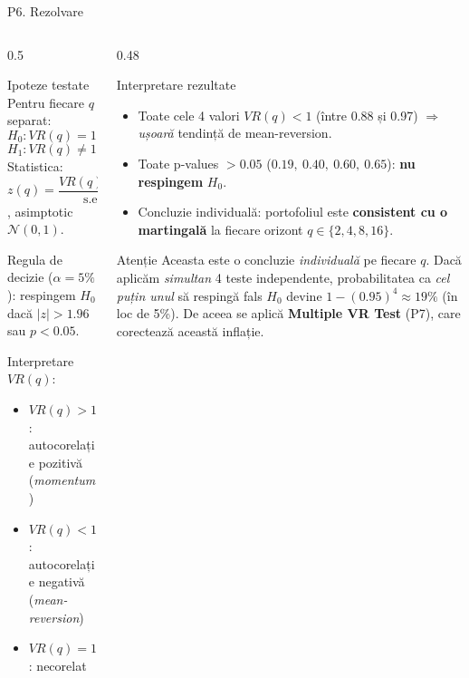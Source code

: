 \documentclass[9pt, aspectratio=169, t]{beamer}
\begin{document}
\begin{frame}[shrink=30]{P6. Rezolvare}
\begin{columns}[T]
\begin{column}{0.5\textwidth}
\begin{block}{Ipoteze testate}
Pentru fiecare $q$ separat:
\[
H_0: VR(q) = 1 \quad\Leftrightarrow\quad r_t \text{ martingal ( $P_t$ random walk)}
\]
\[
H_1: VR(q) \neq 1 \quad\Leftrightarrow\quad \text{autocorelație nenulă}
\]
Statistica: $z(q) = \dfrac{VR(q) - 1}{\text{s.e.}}$, asimptotic $\mathcal N(0,1)$.

Regula de decizie ($\alpha=5\%$): respingem $H_0$ dacă $|z|>1.96$ sau $p<0.05$.

Interpretare $VR(q)$:
\begin{itemize}\setlength{\itemsep}{0pt}
    \item $VR(q)>1$: autocorelație pozitivă (\emph{momentum})
    \item $VR(q)<1$: autocorelație negativă (\emph{mean-reversion})
    \item $VR(q)=1$: necorelat
\end{itemize}
\end{block}
\end{column}
\begin{column}{0.48\textwidth}
\begin{block}{Interpretare rezultate}
\begin{itemize}\setlength{\itemsep}{1pt}
    \item Toate cele 4 valori $VR(q) < 1$ (între 0.88 și 0.97) $\Rightarrow$ \emph{ușoară} tendință de mean-reversion.
    \item Toate p-values $> 0.05$ ($0.19,\ 0.40,\ 0.60,\ 0.65$): \textbf{nu respingem} $H_0$.
    \item Concluzie individuală: portofoliul este \textbf{consistent cu o martingală} la fiecare orizont $q\in\{2,4,8,16\}$.
\end{itemize}
\end{block}
\begin{alertblock}{Atenție}
Aceasta este o concluzie \emph{individuală} pe fiecare $q$. Dacă aplicăm \emph{simultan} 4 teste independente, probabilitatea ca \emph{cel puțin unul} să respingă fals $H_0$ devine $1-(0.95)^4 \approx 19\%$ (în loc de 5\%). De aceea se aplică \textbf{Multiple VR Test} (P7), care corectează această inflație.
\end{alertblock}
\end{column}
\end{columns}
\end{frame}
\end{document}
